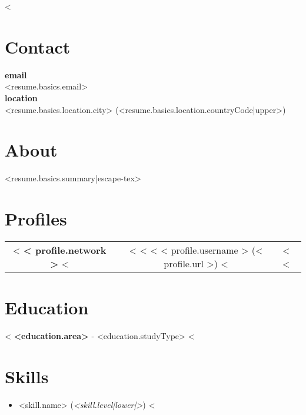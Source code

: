 \documentclass{resume}
\begin{document}
<%
\section{Contact}
\begin{multicols}{2}
\textbf{email}\\
<{resume.basics.email}>\\
\textbf{location}\\
<{resume.basics.location.city}> (<{resume.basics.location.countryCode|upper}>)
\end{multicols}
\section{About}
<{resume.basics.summary|escape-tex}>
\section{Profiles}
\begin{center}
  \begin{tabular}{ c c }
    <%
    \textbf{<{ profile.network }>}
    <%
    &
    <%
    <%
    <%
    <{ profile.username }> (<{ profile.url }>)
    <%
    &
    <%
    <%
  \end{tabular}
\end{center}
\section{Education}
<%
\textbf{<{education.area}>} - <{education.studyType}>
<%
\section{Skills}
\begin{multicols}{2}
  \begin{itemize}
    \setlength\itemsep{0.1em}
  <%
  \item <{skill.name}> (\textit{<{skill.level|lower|}>})
  <%
  \end{itemize}
  \vspace{0.5em}
\end{multicols}
\end{document}

